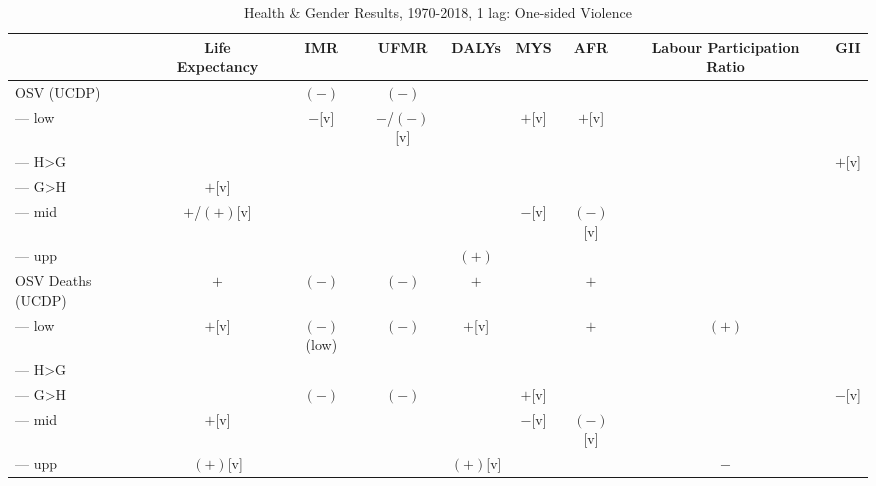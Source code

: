 \documentclass[12pt]{article}
\begin{document}
\begin{table}
\small
\centering
\caption{Health \& Gender Results, 1970-2018, 1 lag: One-sided Violence}
\label{table_summary}
\begin{tabular}{lcccccccc}
\toprule
                          & Life Expectancy     & IMR                 & UFMR         & DALYs           & MYS      & AFR                           & Labour Participation Ratio     & GII \\
\midrule
OSV (UCDP)                &                     & $(-)$               & $(-)$        &                 &          &                               &                                & \\
--- low                   &                     & $-$[v]              & $-$/$(-)$[v] &                 & $+$[v]   & $+$[v]                        &                                & \\
--- H>G                   &                     &                     &              &                 &          &                               &                                & $+$[v] \\
--- G>H                   & $+$[v]              &                     &              &                 &          &                               &                                & \\
--- mid                   & $+$/$(+)$[v]        &                     &              &                 & $-$[v]   & $(-)$[v]                      &                                & \\
--- upp                   &                     &                     &              & $(+)$           &          &                               &                                & \\
OSV Deaths (UCDP)         & $+$                 & $(-)$               & $(-)$        & $+$             &          & $+$                           &                                & \\
--- low                   & $+$[v]              & $(-)$(low)          & $(-)$        & $+$[v]          &          & $+$                           & $(+)$                          & \\
--- H>G                   &                     &                     &              &                 &          &                               &                                & \\
--- G>H                   &                     & $(-)$               & $(-)$        &                 & $+$[v]   &                               &                                & $-$[v] \\
--- mid                   & $+$[v]              &                     &              &                 & $-$[v]   & $(-)$[v]                      &                                & \\
--- upp                   & $(+)$[v]            &                     &              & $(+)$[v]        &          &                               & $-$                            & \\
\bottomrule
\end{tabular}
\end{table}
\end{document}
